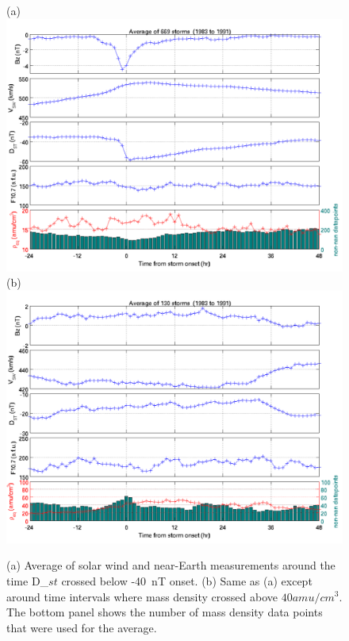 \documentclass[10pt,twocolumn]{article}
\begin{document}
\begin{figure}[htp!]
\centering
(a)
\includegraphics[scale=0.7]{paperfigures/stormavs-dst.png}
(b)
\includegraphics[scale=0.7]{paperfigures/stormavs-mass.png}
\caption{(a) Average of solar wind and near-Earth measurements around the time D_${st}$ crossed below -40~nT onset. (b) Same as (a) except around time intervals where mass density crossed above $40 amu/cm^3$.  The bottom panel shows the number of mass density data points that were used for the average.}
\label{MassStorm}
\end{figure}
\clearpage
\end{document}
